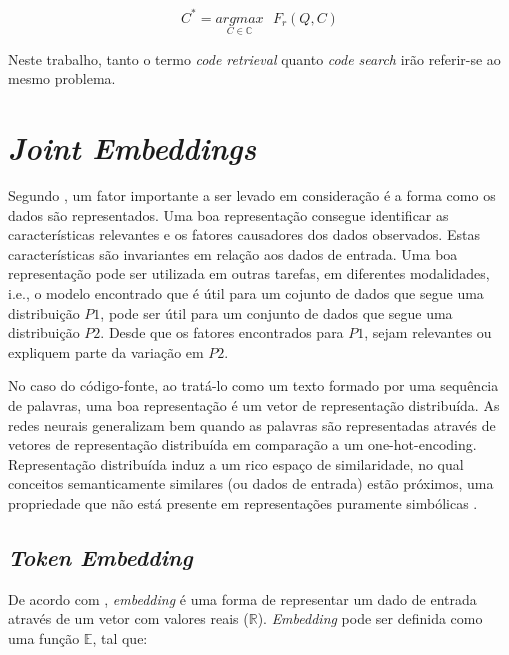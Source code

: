 \begin{equation}\label{eq:code-retrieval}
C^{*} = \underset{C \in \mathbb{C}}{argmax}\text{ } F_{r}(Q , C)
\end{equation}

Neste trabalho, tanto o termo \textit{code retrieval} quanto \textit{code search} irão referir-se ao mesmo problema.



\section{\textit{Joint Embeddings}}

Segundo \cite{Goodfellow-et-al-2016:representation-learning}, um fator importante a ser levado em consideração é a forma como os dados são representados. Uma boa representação consegue identificar as características relevantes e os fatores causadores dos dados observados. Estas características são invariantes em relação aos dados de entrada. Uma boa representação pode ser utilizada em outras tarefas, em diferentes modalidades, i.e., o modelo encontrado que é útil para um cojunto de dados que segue uma distribuição $P1$, pode ser útil para um conjunto de dados que segue uma distribuição $P2$. Desde que os fatores encontrados para $P1$, sejam relevantes ou expliquem parte da variação em $P2$.

No caso do código-fonte, ao tratá-lo como um texto formado por uma sequência de palavras, uma boa representação é um vetor de representação distribuída. As redes neurais generalizam bem quando as palavras são representadas através de vetores de representação distribuída em comparação a um \gls{one-hot-encoding}. Representação distribuída induz a um rico espaço de similaridade, no qual conceitos semanticamente similares (ou dados de entrada) estão próximos, uma propriedade que não está presente em representações puramente simbólicas \citep{Goodfellow-et-al-2016:representation-learning}.



\subsection{\textit{Token Embedding}}

De acordo com \cite{cambronero-deep-learning-code-search:2019}, \textit{embedding} é uma forma de representar um dado de entrada através de um vetor com valores reais ($\mathbb{R}$). \textit{Embedding} pode ser definida como uma função $\mathbb{E}$, tal que:

